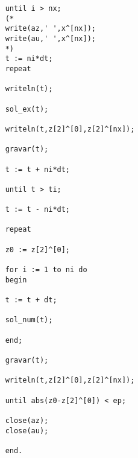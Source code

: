 \begin{verbatim}
	until i > nx;
	(*
	write(az,' ',x^[nx]);
	write(au,' ',x^[nx]);
	*)
	t := ni*dt;
	repeat
	
	writeln(t);
	
	sol_ex(t);
	
	writeln(t,z[2]^[0],z[2]^[nx]);
	
	gravar(t);
	
	t := t + ni*dt;
	
	until t > ti;
	
	t := t - ni*dt;
	
	repeat
	
	z0 := z[2]^[0];
	
	for i := 1 to ni do
	begin
	
	t := t + dt;
	
	sol_num(t);
	
	end;
	
	gravar(t);
	
	writeln(t,z[2]^[0],z[2]^[nx]);
	
	until abs(z0-z[2]^[0]) < ep;
	
	close(az);
	close(au);
	
	end.
	
\end{verbatim}

